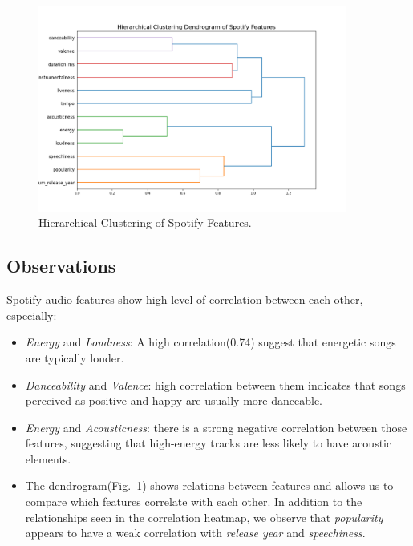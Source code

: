 \begin{center}
\begin{figure}[H]
  \centering
  \includegraphics[width=4in]{img/dendrogram_spotify_features.png}
  \caption{Hierarchical Clustering of Spotify Features.}
  \label{Figure:dendrogram_spotify_features}
\end{figure}
\end{center}

\subsection*{Observations}
Spotify audio features show high level of correlation between each other, especially:
\begin{itemize}
  \item \textit{Energy} and \textit{Loudness}: A high correlation(0.74) suggest
    that energetic songs are typically louder.
  \item \textit{Danceability} and \textit{Valence}: high correlation between
    them indicates that songs perceived as positive and happy are usually more
    danceable.
  \item \textit{Energy} and \textit{Acousticness}: there is a strong negative
    correlation between those features, suggesting that high-energy tracks are
    less likely to have acoustic elements.
  \item The dendrogram(Fig.~\ref{Figure:dendrogram_spotify_features}) shows relations
    between features and allows us to compare which features correlate with
    each other. In addition to the relationships seen in the correlation
    heatmap, we observe that \textit{popularity} appears to have a weak
    correlation with \textit{release year} and \textit{speechiness}.

\end{itemize}





